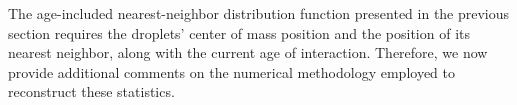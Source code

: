 
The age-included nearest-neighbor distribution function presented in the previous section requires the droplets' center of mass position and the position of its nearest neighbor, along with the current age of interaction.
Therefore, we now provide additional comments on the numerical methodology employed to reconstruct these statistics. 


